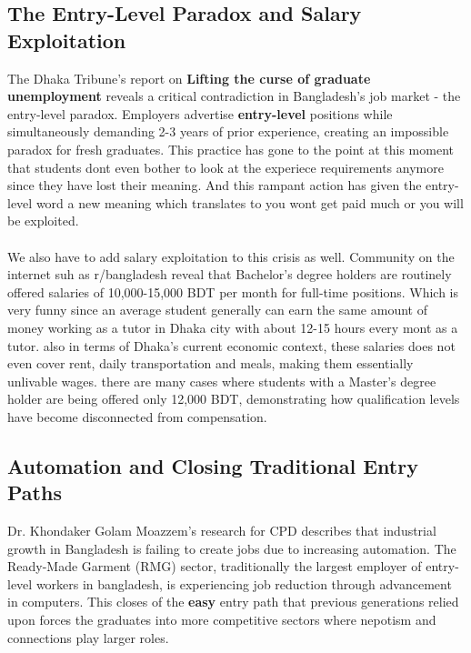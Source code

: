 \documentclass[a4paper, 14pt, openany]{extreport}
\begin{document}
	\subsection{The Entry-Level Paradox and Salary Exploitation}
	
	The Dhaka Tribune's report on \textbf{Lifting the curse of graduate unemployment} reveals a critical contradiction in Bangladesh's job market - the entry-level paradox\cite{dhaka_tribune_graduate_unemployment}. Employers advertise \textbf{entry-level} positions while simultaneously demanding 2-3 years of prior experience, creating an impossible paradox for fresh graduates. This practice has gone to the point at this moment that students dont even bother to look at the experiece requirements anymore since they have lost their meaning. And this rampant action has given the entry-level word a new meaning which translates to you wont get paid much or you will be exploited.
	\\
	\\
	We also have to add salary exploitation to this crisis as well. Community on the internet suh as r/bangladesh reveal that Bachelor's degree holders are routinely offered salaries of 10,000-15,000 BDT per month for full-time positions\cite{reddit_job_mental_health}. Which is very funny since an average student generally can earn the same amount of money working as a tutor in Dhaka city with about 12-15 hours every mont as a tutor. also in terms of Dhaka's current economic context, these salaries does not even cover rent, daily transportation and meals, making them essentially unlivable wages. there are many cases where students with a Master's degree holder are being offered only 12,000 BDT, demonstrating how qualification levels have become disconnected from compensation.
	
	\subsection{Automation and Closing Traditional Entry Paths}
	
	Dr. Khondaker Golam Moazzem's research for CPD describes that industrial growth in Bangladesh is failing to create jobs due to increasing automation\cite{cpd_industrial_jobs}. The Ready-Made Garment (RMG) sector, traditionally the largest employer of entry-level workers in bangladesh, is experiencing job reduction through advancement in computers. This closes of the \textbf{easy} entry path that previous generations relied upon forces the graduates into more competitive sectors where nepotism and connections play larger roles.
	
\end{document}
